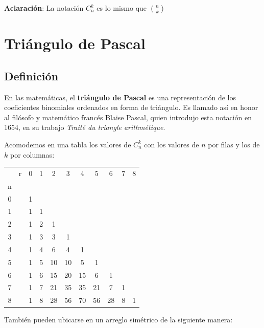 \textbf{Aclaración}: La notación $C^k_n$ es lo mismo que $\binom{n}{k}$


\section{Triángulo de Pascal}

\subsection{Definición}

\begin{definicion}
    En las matemáticas, el \textbf{triángulo de Pascal} es una representación de los coeficientes binomiales ordenados en forma de triángulo. Es llamado así en honor al filósofo y matemático francés Blaise Pascal, quien introdujo esta notación en 1654, en su trabajo \textit{Traité du triangle arithmétique}.
\end{definicion}

Acomodemos en una tabla los valores de $C^{k}_{n}$ con los valores de $n$ por filas y los de $k$ por columnas:

\begin{center}
    \begin{tabular}{|cc|ccccccccc|}
    \hline
      & r & 0 & 1 & 2  & 3  & 4  & 5  & 6  & 7 & 8 \\
    n &   &   &   &    &    &    &    &    &   &   \\ \hline
    0 &   & 1 &   &    &    &    &    &    &   &   \\
    1 &   & 1 & 1 &    &    &    &    &    &   &   \\
    2 &   & 1 & 2 & 1  &    &    &    &    &   &   \\
    3 &   & 1 & 3 & 3  & 1  &    &    &    &   &   \\
    4 &   & 1 & 4 & 6  & 4  & 1  &    &    &   &   \\
    5 &   & 1 & 5 & 10 & 10 & 5  & 1  &    &   &   \\
    6 &   & 1 & 6 & 15 & 20 & 15 & 6  & 1  &   &   \\
    7 &   & 1 & 7 & 21 & 35 & 35 & 21 & 7  & 1 &   \\
    8 &   & 1 & 8 & 28 & 56 & 70 & 56 & 28 & 8 & 1 \\ \hline
    \end{tabular}
\end{center}

También pueden ubicarse en un arreglo simétrico de la siguiente manera:

